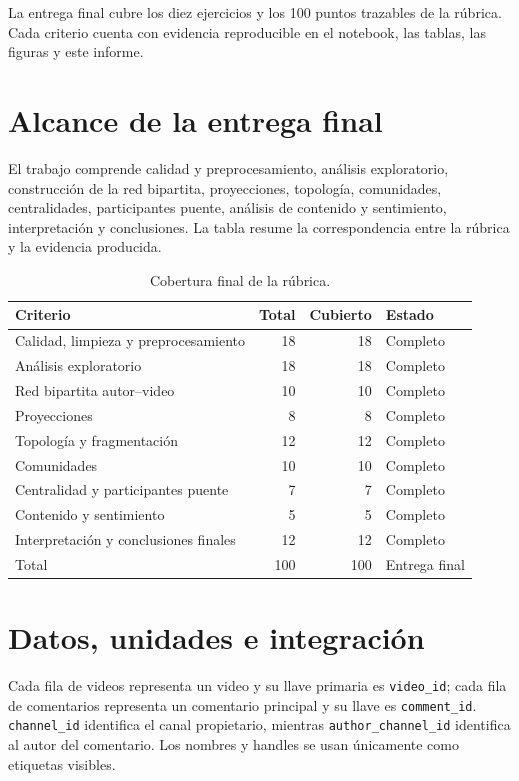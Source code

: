 \documentclass[11pt]{article}
\begin{document}
La entrega final cubre los diez ejercicios y los 100 puntos trazables de la rúbrica. Cada criterio cuenta con evidencia reproducible en el notebook, las tablas, las figuras y este informe.

\section{Alcance de la entrega final}

El trabajo comprende calidad y preprocesamiento, análisis exploratorio, construcción de la red bipartita, proyecciones, topología, comunidades, centralidades, participantes puente, análisis de contenido y sentimiento, interpretación y conclusiones. La tabla resume la correspondencia entre la rúbrica y la evidencia producida.

\begin{table}[H]
\centering
\caption{Cobertura final de la rúbrica.}
\begin{tabular}{p{}rrl}
\toprule
Criterio & Total & Cubierto & Estado\\
\midrule
Calidad, limpieza y preprocesamiento & 18 & 18 & Completo\\
Análisis exploratorio & 18 & 18 & Completo\\
Red bipartita autor--video & 10 & 10 & Completo\\
Proyecciones & 8 & 8 & Completo\\
Topología y fragmentación & 12 & 12 & Completo\\
Comunidades & 10 & 10 & Completo\\
Centralidad y participantes puente & 7 & 7 & Completo\\
Contenido y sentimiento & 5 & 5 & Completo\\
Interpretación y conclusiones finales & 12 & 12 & Completo\\
\midrule
Total & 100 & 100 & Entrega final\\
\bottomrule
\end{tabular}
\end{table}

\section{Datos, unidades e integración}

Cada fila de videos representa un video y su llave primaria es \texttt{video\_id}; cada fila de comentarios representa un comentario principal y su llave es \texttt{comment\_id}. \texttt{channel\_id} identifica el canal propietario, mientras \texttt{author\_channel\_id} identifica al autor del comentario. Los nombres y handles se usan únicamente como etiquetas visibles.
\end{document}
